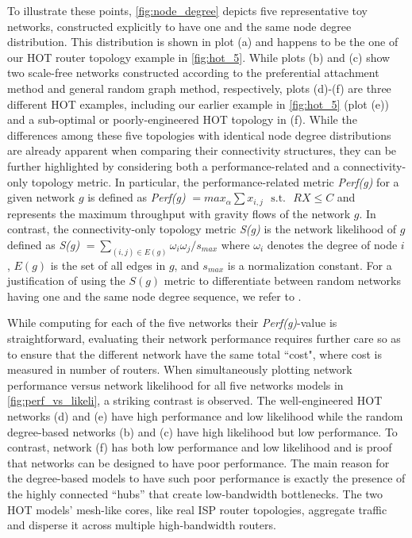 To illustrate these points, \autoref{fig:node_degree} depicts five
representative toy networks, constructed explicitly to have one and
the same node degree distribution. This distribution is shown in plot
(a) and happens to be the one of our HOT router topology example in
\autoref{fig:hot_5}. While plots (b) and (c) show two scale-free
networks constructed according to the preferential attachment method
and general random graph method, respectively, plots (d)-(f) are
three different HOT examples, including our earlier example in
\autoref{fig:hot_5} (plot (e)) and a sub-optimal or poorly-engineered
HOT topology in (f). While the differences among these five topologies
with identical node degree distributions are already apparent when
comparing their connectivity structures, they can be further
highlighted by considering both a performance-related and a
connectivity-only topology metric.  In particular, the
performance-related metric {\em Perf(g)} for a given network $g$ is
defined as {\em{Perf(g)}} $ = max_{\alpha} \sum x_{i,j}
\mbox{~~s.t.~~} RX \leq C$ and represents the maximum throughput with
gravity flows of the network $g$. In contrast, the connectivity-only
topology metric {\em S(g)} is the network likelihood of $g$ defined as
{\em S(g)} $ = \sum_{(i,j) \in E(g)} \omega_i \omega_j /s_{max}$ where
$\omega_i$ denotes the degree of node $i$, $E(g)$ is the set of all
edges in $g$, and $s_{max}$ is a normalization constant. For a
justification of using the $S(g)$ metric to differentiate between
random networks having one and the same node degree sequence, we refer
to \cite{Li_internet_math}.

While computing for each of the five networks their {\em Perf(g)}-value is straightforward, 
evaluating their network performance requires further care so as to ensure that the 
different network have the same total ``cost", where cost is measured in number of routers.
When simultaneously plotting network performance versus network likelihood for all
five networks models in \autoref{fig:perf_vs_likeli}, a striking contrast is observed. The well-engineered
HOT networks (d) and (e) have high performance and low likelihood while the random
degree-based networks (b) and (c) have high likelihood but low performance. To contrast,
network (f) has both low performance and low likelihood and is proof that networks can be
designed to have poor performance. The main reason
for the degree-based models to have such poor performance is exactly the presence of the 
highly connected ``hubs'' that create low-bandwidth bottlenecks. The two HOT models'
mesh-like cores, like real ISP router topologies, aggregate traffic and disperse it
across multiple high-bandwidth routers.


